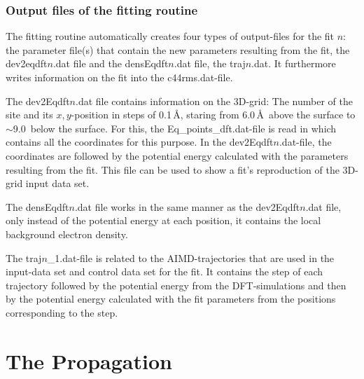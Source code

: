 \documentclass[twoside, 11pt, titlepage, captions=nooneline, a4paper, headsepline]{scrbook}%
\begin{document}
\subsubsection{Output files of the fitting routine}
The fitting routine automatically creates four types of output-files for the fit $n$: the parameter file(s) that contain the new parameters resulting from the fit, the dev2eqdft$n$.dat file and the densEqdft$n$.dat file, the traj$n$.dat. It furthermore writes information on the fit into the c44rms.dat-file.

The dev2Eqdft$n$.dat file contains information on the 3D-grid: The number of the site and its $x,y$-position in steps of 0.1\,\AA, staring from 6.0\,\AA~above the surface to $\sim$9.0\ below the surface. For this, the Eq\_points\_dft.dat-file is read in which contains all the coordinates for this purpose. In the dev2Eqdft$n$.dat-file, the coordinates are followed by the potential energy calculated with the parameters resulting from the fit. This file can be used to show a fit's reproduction of the 3D-grid input data set.

The densEqdft$n$.dat file works in the same manner as the dev2Eqdft$n$.dat file, only instead of the potential energy at each position, it contains the local background electron density.

The traj$n$\_1.dat-file is related to the AIMD-trajectories that are used in the input-data set and control data set for the fit. It contains the step of each trajectory followed by the potential energy from the DFT-simulations and then by the potential energy calculated with the fit parameters from the positions corresponding to the step.

\section{The Propagation}
\end{document}
